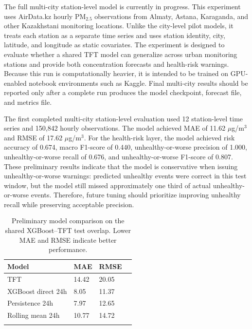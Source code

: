 \documentclass[pdflatex,sn-mathphys-num]{sn-jnl}
\begin{document}
The full multi-city station-level model is currently in progress. This experiment uses AirData.kz hourly PM$_{2.5}$ observations from Almaty, Astana, Karaganda, and other Kazakhstani monitoring locations. Unlike the city-level pilot models, it treats each station as a separate time series and uses station identity, city, latitude, and longitude as static covariates. The experiment is designed to evaluate whether a shared TFT model can generalize across urban monitoring stations and provide both concentration forecasts and health-risk warnings. Because this run is computationally heavier, it is intended to be trained on GPU-enabled notebook environments such as Kaggle. Final multi-city results should be reported only after a complete run produces the model checkpoint, forecast file, and metrics file.

The first completed multi-city station-level evaluation used 12 station-level time series and 150,842 hourly observations. The model achieved MAE of 11.62 $\mu$g/m$^3$ and RMSE of 17.62 $\mu$g/m$^3$. For the health-risk layer, the model achieved risk accuracy of 0.674, macro F1-score of 0.440, unhealthy-or-worse precision of 1.000, unhealthy-or-worse recall of 0.676, and unhealthy-or-worse F1-score of 0.807. These preliminary results indicate that the model is conservative when issuing unhealthy-or-worse warnings: predicted unhealthy events were correct in this test window, but the model still missed approximately one third of actual unhealthy-or-worse events. Therefore, future tuning should prioritize improving unhealthy recall while preserving acceptable precision.

\begin{table}[h]
\caption{Preliminary model comparison on the shared XGBoost--TFT test overlap. Lower MAE and RMSE indicate better performance.}\label{tab:baseline_comparison}
\begin{tabular}{@{}llll@{}}
\toprule
Model & MAE & RMSE\\
\midrule
TFT & 14.42 & 20.05\\
XGBoost direct 24h & 8.05 & 11.37\\
Persistence 24h & 7.97 & 12.65\\
Rolling mean 24h & 10.77 & 14.72\\
\botrule
\end{tabular}
\end{table}
\end{document}
